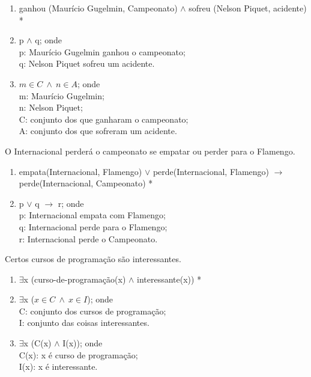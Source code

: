 \begin{enumerate}[label=(\roman*)]
    \item ganhou (Maurício Gugelmin, Campeonato) $\land$ sofreu (Nelson Piquet, acidente) *
    \item p $\land$ q; onde\\
    p: Maurício Gugelmin ganhou o campeonato;\\
    q: Nelson Piquet sofreu um acidente.
    \item $m \in C\ \land\ n \in A$; onde\\
    m: Maurício Gugelmin;\\
    n: Nelson Piquet;\\
    C: conjunto dos que ganharam o campeonato;\\
    A: conjunto dos que sofreram um acidente.
\end{enumerate}

\bigskip
\begin{exemplo} O Internacional perderá o campeonato se empatar ou perder para o Flamengo.
\end{exemplo}

\begin{enumerate}[label=(\roman*)]
    \item empata(Internacional, Flamengo) $\lor$ perde(Internacional, Flamengo) $\to$ perde(Internacional, Campeonato) *
    \item p $\lor$ q $\to$ r; onde\\
    p: Internacional empata com Flamengo;\\
    q: Internacional perde para o Flamengo;\\
    r: Internacional perde o Campeonato.
\end{enumerate}

\bigskip
\begin{exemplo} Certos cursos de programação são interessantes.
\end{exemplo}

\begin{enumerate}[label=(\roman*)]
    \item $\exists$x (curso-de-programação(x) $\land$ interessante(x)) *
    \item $\exists$x ($x \in C\ \land\ x \in I$); onde\\
    C: conjunto dos cursos de programação;\\
    I: conjunto das coisas interessantes.
    \item $\exists$x (C(x) $\land$ I(x)); onde\\
    C(x): x é curso de programação;\\
    I(x): x é interessante.
\end{enumerate}


